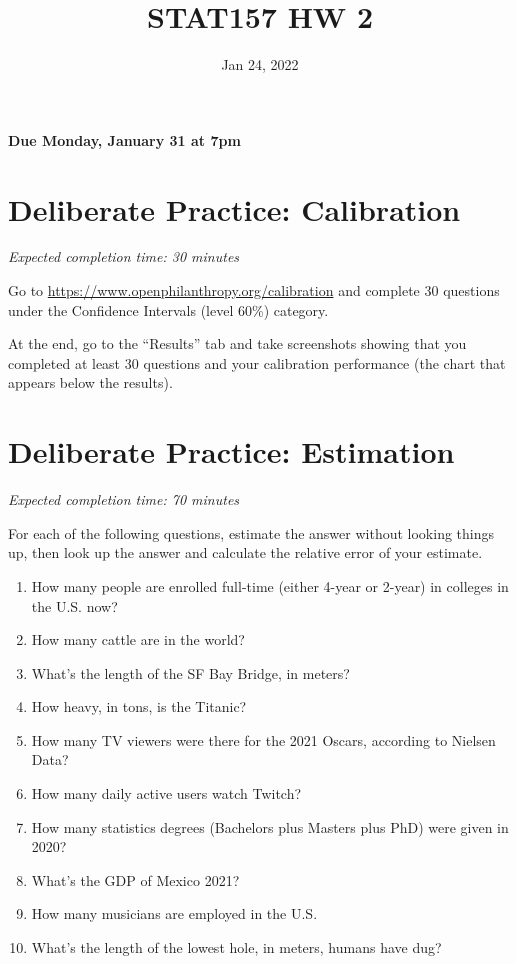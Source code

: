 \documentclass[11pt]{article}
\title{STAT157 HW 2}
\date{Jan 24, 2022}
\begin{document}
\maketitle

\hfill \textbf{Due Monday, January 31 at 7pm}

\section*{Deliberate Practice: Calibration}

\emph{Expected completion time: 30 minutes}

Go to \url{https://www.openphilanthropy.org/calibration} and complete 30 questions under the Confidence Intervals (level 60\%) category.

At the end, go to the ``Results'' tab and take screenshots showing that 
you completed at least 30 questions and your calibration 
performance (the chart that appears below the results).

\section*{Deliberate Practice: Estimation}

\emph{Expected completion time: 70 minutes}

For each of the following questions, estimate the answer without looking things up, then look up the answer and calculate the relative error of your estimate. 


\begin{enumerate}
	\item How many people are enrolled full-time (either 4-year or 2-year) in colleges in the U.S. now? 
	\item How many cattle are in the world? 
	\item What's the length of the SF Bay Bridge, in meters? 
	\item How heavy, in tons, is the Titanic? 
	\item How many TV viewers were there for the 2021 Oscars, according to Nielsen Data? 
	\item How many daily active users watch Twitch? 
	\item How many statistics degrees (Bachelors plus Masters plus PhD) were given in 2020? 
	\item What's the GDP of Mexico 2021? 
	\item How many musicians are employed in the U.S. 
	\item What's the length of the lowest hole, in meters, humans have dug? 
\end{enumerate}
\end{document}
